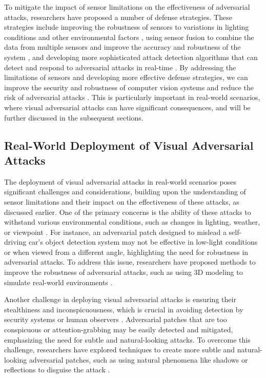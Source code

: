 \documentclass[11pt]{article}
\begin{document}
To mitigate the impact of sensor limitations on the effectiveness of adversarial attacks, researchers have proposed a number of defense strategies. These strategies include improving the robustness of sensors to variations in lighting conditions and other environmental factors \cite{ref152}, using sensor fusion to combine the data from multiple sensors and improve the accuracy and robustness of the system \cite{ref153}, and developing more sophisticated attack detection algorithms that can detect and respond to adversarial attacks in real-time \cite{ref154}. By addressing the limitations of sensors and developing more effective defense strategies, we can improve the security and robustness of computer vision systems and reduce the risk of adversarial attacks \cite{ref155}. This is particularly important in real-world scenarios, where visual adversarial attacks can have significant consequences, and will be further discussed in the subsequent sections.

\subsection{Real-World Deployment of Visual Adversarial Attacks}

The deployment of visual adversarial attacks in real-world scenarios poses significant challenges and considerations, building upon the understanding of sensor limitations and their impact on the effectiveness of these attacks, as discussed earlier. One of the primary concerns is the ability of these attacks to withstand various environmental conditions, such as changes in lighting, weather, or viewpoint \cite{ref145}. For instance, an adversarial patch designed to mislead a self-driving car's object detection system may not be effective in low-light conditions or when viewed from a different angle, highlighting the need for robustness in adversarial attacks. To address this issue, researchers have proposed methods to improve the robustness of adversarial attacks, such as using 3D modeling to simulate real-world environments \cite{ref156}.

Another challenge in deploying visual adversarial attacks is ensuring their stealthiness and inconspicuousness, which is crucial in avoiding detection by security systems or human observers \cite{ref18}. Adversarial patches that are too conspicuous or attention-grabbing may be easily detected and mitigated, emphasizing the need for subtle and natural-looking attacks. To overcome this challenge, researchers have explored techniques to create more subtle and natural-looking adversarial patches, such as using natural phenomena like shadows or reflections to disguise the attack \cite{ref18}.
\end{document}
